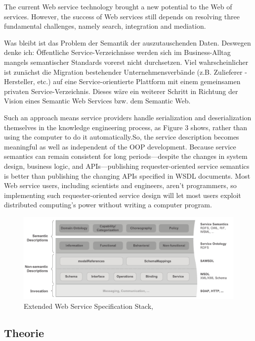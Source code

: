 \documentclass[10pt,a4paper]{article}
\begin{document}
The current Web service technology brought a new potential
to the Web of services. However, the success of Web
services still depends on resolving three fundamental challenges,
namely search, integration and mediation. \cite{WSMOLITE}

Was bleibt ist das Problem der Semantik der auszutauschenden Daten. Deswegen denke ich: Öffentliche Service-Verzeichnisse werden sich im Business-Alltag mangels semantischer Standards vorerst nicht durchsetzen. Viel wahrscheinlicher ist zunächst die Migration bestehender Unternehmensverbände (z.B. Zulieferer - Hersteller, etc.) auf eine Service-orientierte Plattform mit einem gemeinsamen privaten Service-Verzeichnis. Dieses wäre ein weiterer Schritt in Richtung der Vision eines Semantic Web Services bzw. dem Semantic Web.  \cite{hhxmlwssoa} 

Such an approach means service providers handle serialization
and deserialization themselves in the knowledge
engineering process, as Figure 3 shows, rather than using
the computer to do it automatically.So, the service description
becomes meaningful as well as independent of the
OOP development.
Because service semantics can remain consistent for long
periods—despite the changes in system design, business
logic, and APIs—publishing requester-oriented service
semantics is better than publishing the changing APIs specified
in WSDL documents. Most Web service users, including
scientists and engineers, aren’t programmers, so
implementing such requester-oriented service design will
let most users exploit distributed computing’s power without
writing a computer program. \cite{shi1}

\begin{figure}
\includegraphics[width=14cm]{media/Extended-Web-Service-Specification-Stack.pdf}
\caption{Extended Web Service Specification Stack, \cite{WSMOLITE}}
\end{figure}

\subsection{Theorie}
\end{document}
